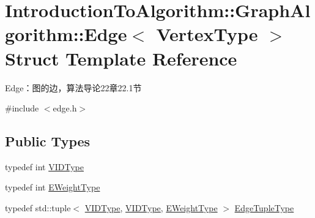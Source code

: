 \hypertarget{struct_introduction_to_algorithm_1_1_graph_algorithm_1_1_edge}{}\section{Introduction\+To\+Algorithm\+:\+:Graph\+Algorithm\+:\+:Edge$<$ Vertex\+Type $>$ Struct Template Reference}
\label{struct_introduction_to_algorithm_1_1_graph_algorithm_1_1_edge}


Edge：图的边，算法导论22章22.1节  




{\ttfamily \#include $<$edge.\+h$>$}

\subsection*{Public Types}
\begin{DoxyCompactItemize}
\item 
typedef int \hyperlink{struct_introduction_to_algorithm_1_1_graph_algorithm_1_1_edge_af4bfb54d5d23ecd5aa428f62b5553e93}{V\+I\+D\+Type}
\item 
typedef int \hyperlink{struct_introduction_to_algorithm_1_1_graph_algorithm_1_1_edge_aa85e33d0381e5e71188dfafc58dcccc7}{E\+Weight\+Type}
\item 
typedef std\+::tuple$<$ \hyperlink{struct_introduction_to_algorithm_1_1_graph_algorithm_1_1_edge_af4bfb54d5d23ecd5aa428f62b5553e93}{V\+I\+D\+Type}, \hyperlink{struct_introduction_to_algorithm_1_1_graph_algorithm_1_1_edge_af4bfb54d5d23ecd5aa428f62b5553e93}{V\+I\+D\+Type}, \hyperlink{struct_introduction_to_algorithm_1_1_graph_algorithm_1_1_edge_aa85e33d0381e5e71188dfafc58dcccc7}{E\+Weight\+Type} $>$ \hyperlink{struct_introduction_to_algorithm_1_1_graph_algorithm_1_1_edge_a2eb9ac670ab79db90876e60538615858}{Edge\+Tuple\+Type}
\end{DoxyCompactItemize}
